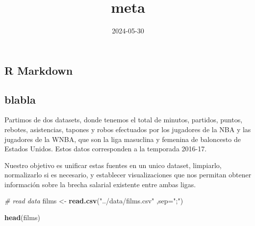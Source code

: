 \documentclass[
]{article}
\title{meta}
\author{}
\date{\vspace{-2.5em}2024-05-30}
\newenvironment{Shaded}{\begin{snugshade}}{\end{snugshade}}
\newcommand{\AttributeTok}[1]{\textcolor[rgb]{0.13,0.29,0.53}{#1}}
\newcommand{\CommentTok}[1]{\textcolor[rgb]{0.56,0.35,0.01}{\textit{#1}}}
\newcommand{\FunctionTok}[1]{\textcolor[rgb]{0.13,0.29,0.53}{\textbf{#1}}}
\newcommand{\NormalTok}[1]{#1}
\newcommand{\OtherTok}[1]{\textcolor[rgb]{0.56,0.35,0.01}{#1}}
\newcommand{\StringTok}[1]{\textcolor[rgb]{0.31,0.60,0.02}{#1}}
\begin{document}
\maketitle

\subsection{R Markdown}\label{r-markdown}

\subsection{blabla}\label{blabla}

Partimos de dos datasets, donde tenemos el total de minutos, partidos,
puntos, rebotes, asistencias, tapones y robos efectuados por los
jugadores de la NBA y las jugadores de la WNBA, que son la liga
masuclina y femenina de baloncesto de Estados Unidos. Estos datos
corresponden a la temporada 2016-17.

Nuestro objetivo es unificar estas fuentes en un unico dataset,
limpiarlo, normalizarlo si es necesario, y establecer visualizaciones
que nos permitan obtener información sobre la brecha salarial existente
entre ambas ligas.

\begin{Shaded}
\begin{Highlighting}[]
\CommentTok{\# read data}
\NormalTok{films }\OtherTok{\textless{}{-}} \FunctionTok{read.csv}\NormalTok{(}\StringTok{"../data/films.csv"}\NormalTok{ ,}\AttributeTok{sep=}\StringTok{";"}\NormalTok{)}

\FunctionTok{head}\NormalTok{(films)}
\end{Highlighting}
\end{Shaded}
\end{document}
